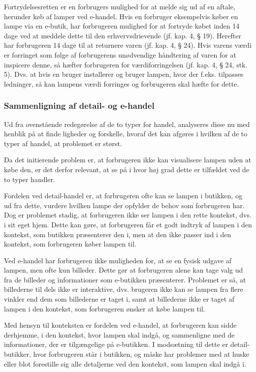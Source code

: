 Fortrydelsesretten er en forbrugers mulighed for at melde sig ud af en aftale, herunder køb af lamper ved e-handel. Hvis en forbruger eksempelvis køber en lampe via en e-butik, har forbrugeren mulighed for at fortryde købet inden 14 dage ved at meddele dette til den erhvervsdrievende (jf. kap. 4, § 19). Herefter har forbrugeren 14 dage til at returnere varen (jf. kap. 4, § 24). Hvis varens værdi er forringet som følge af forbrugerens unødvendige håndtering af varen for at inspicere denne, så hæfter forbrugeren for værdiforringelsen (jf. kap. 4, § 24, stk. 5). Dvs. at hvis en bruger installerer og bruger lampen, hvor der f.eks. tilpasses ledninger, så kan lampens værdi forringes og forbrugeren skal hæfte for dette. 

\subsubsection{Sammenligning af detail- og e-handel}
Ud fra ovenstående redegørelse af de to typer for handel, analyseres disse nu med henblik på at finde ligheder og forskelle, hvoraf det kan afgøres i hvilken af de to typer af handel, at problemet er størst. 

Da det initierende problem er, at forbrugeren ikke kan visualisere lampen uden at købe den, er det derfor relevant, at se på i hvor høj grad dette er tilfældet ved de to typer handler.

Fordelen ved detail-handel er, at forbrugeren ofte kan se lampen i butikken, og ud fra dette, vurdere hvilken lampe der opfylder de behov som forbrugeren har. Dog er problemet stadig, at forbrugeren ikke ser lampen i den rette kontekst, dvs. i sit eget hjem. Dette kan gøre, at forbrugeren får et godt indtryk af lampen i den kontekst, som butikken præsenterer den i, men at den ikke passer ind i den kontekst, som forbrugeren køber lampen til.

Ved e-handel har forbrugeren ikke muligheden for, at se en fysisk udgave af lampen, men ofte kun billeder. Dette gør at forbrugeren alene kan tage valg ud fra de billeder og informationer som e-butikken præsenterer. Problemet er så, at billederne til dels ikke er interaktive, dvs. brugeren ikke kan se lampen fra flere vinkler end dem som billederne er taget i, samt at billederne ikke er taget af lampen i den kontekst, som forbrugeren ønsker at købe lampen til. 

Med hensyn til konteksten er fordelen ved e-handel, at forbrugeren kan sidde derhjemme, i den kontekst, hvor lampen skal indgå, og sammenligne med de informationer, der er tilgængelige på e-butikken. I modsætning til dette er detail-butikker, hvor forbrugeren står i butikken, og måske har problemer med at huske eller blot forestille sig alle detaljerne ved den kontekst, som lampen skal indgå i.

